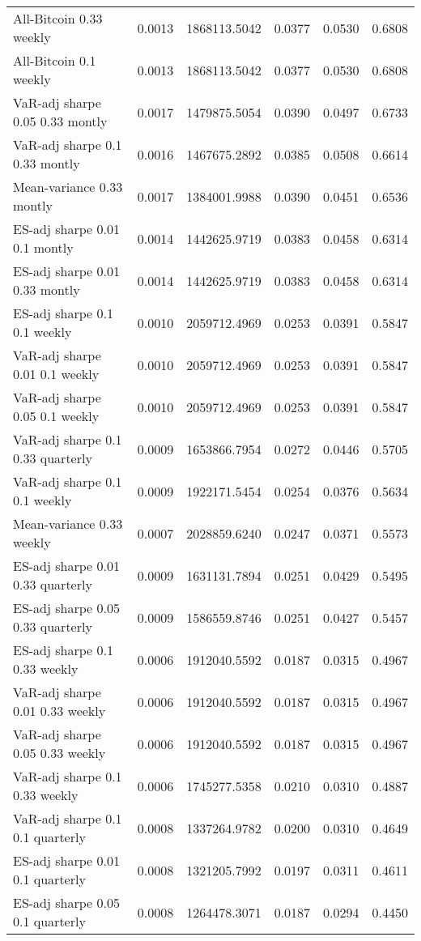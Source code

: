 \begin{tabular}{lccccc}
All-Bitcoin 0.33 weekly & 0.0013 & 1868113.5042 & 0.0377 & 0.0530 & 0.6808\\
All-Bitcoin 0.1 weekly & 0.0013 & 1868113.5042 & 0.0377 & 0.0530 & 0.6808\\
VaR-adj sharpe 0.05 0.33 montly & 0.0017 & 1479875.5054 & 0.0390 & 0.0497 & 0.6733\\
VaR-adj sharpe 0.1 0.33 montly & 0.0016 & 1467675.2892 & 0.0385 & 0.0508 & 0.6614\\
Mean-variance 0.33 montly & 0.0017 & 1384001.9988 & 0.0390 & 0.0451 & 0.6536\\
ES-adj sharpe 0.01 0.1 montly & 0.0014 & 1442625.9719 & 0.0383 & 0.0458 & 0.6314\\
ES-adj sharpe 0.01 0.33 montly & 0.0014 & 1442625.9719 & 0.0383 & 0.0458 & 0.6314\\
ES-adj sharpe 0.1 0.1 weekly & 0.0010 & 2059712.4969 & 0.0253 & 0.0391 & 0.5847\\
VaR-adj sharpe 0.01 0.1 weekly & 0.0010 & 2059712.4969 & 0.0253 & 0.0391 & 0.5847\\
VaR-adj sharpe 0.05 0.1 weekly & 0.0010 & 2059712.4969 & 0.0253 & 0.0391 & 0.5847\\
VaR-adj sharpe 0.1 0.33 quarterly & 0.0009 & 1653866.7954 & 0.0272 & 0.0446 & 0.5705\\
VaR-adj sharpe 0.1 0.1 weekly & 0.0009 & 1922171.5454 & 0.0254 & 0.0376 & 0.5634\\
Mean-variance 0.33 weekly & 0.0007 & 2028859.6240 & 0.0247 & 0.0371 & 0.5573\\
ES-adj sharpe 0.01 0.33 quarterly & 0.0009 & 1631131.7894 & 0.0251 & 0.0429 & 0.5495\\
ES-adj sharpe 0.05 0.33 quarterly & 0.0009 & 1586559.8746 & 0.0251 & 0.0427 & 0.5457\\
ES-adj sharpe 0.1 0.33 weekly & 0.0006 & 1912040.5592 & 0.0187 & 0.0315 & 0.4967\\
VaR-adj sharpe 0.01 0.33 weekly & 0.0006 & 1912040.5592 & 0.0187 & 0.0315 & 0.4967\\
VaR-adj sharpe 0.05 0.33 weekly & 0.0006 & 1912040.5592 & 0.0187 & 0.0315 & 0.4967\\
VaR-adj sharpe 0.1 0.33 weekly & 0.0006 & 1745277.5358 & 0.0210 & 0.0310 & 0.4887\\
VaR-adj sharpe 0.1 0.1 quarterly & 0.0008 & 1337264.9782 & 0.0200 & 0.0310 & 0.4649\\
ES-adj sharpe 0.01 0.1 quarterly & 0.0008 & 1321205.7992 & 0.0197 & 0.0311 & 0.4611\\
ES-adj sharpe 0.05 0.1 quarterly & 0.0008 & 1264478.3071 & 0.0187 & 0.0294 & 0.4450\\

\end{tabular}
